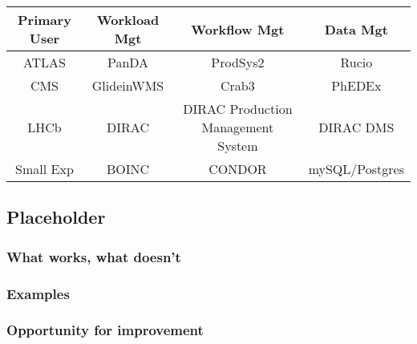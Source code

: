\begin{center}
  \begin{tabular}{  c | c | c | c }
    \hline
    Primary User & Workload Mgt & Workflow Mgt & Data Mgt\\ \hline
    ATLAS & PanDA & ProdSys2 & Rucio\\ \hline
    CMS  & GlideinWMS & Crab3 & PhEDEx\\ \hline
    LHCb  & DIRAC & DIRAC Production Management System & DIRAC DMS\\ \hline
    Small Exp & BOINC & CONDOR & mySQL/Postgres \\ \hline
    \hline
  \end{tabular}
\end{center}

\subsection{Placeholder}
\subsubsection{What works, what doesn't}
\subsubsection{Examples}
\subsubsection{Opportunity for improvement}

